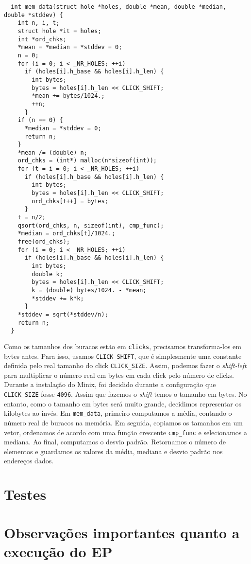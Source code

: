 \documentclass{amsart}
\theoremstyle{plain}
\newcommand{\code}[1]{\lstinline[mathescape=true]{#1}}
\begin{document}
\begin{verbatim}
  int mem_data(struct hole *holes, double *mean, double *median, double *stddev) {
    int n, i, t;
    struct hole *it = holes;
    int *ord_chks;
    *mean = *median = *stddev = 0;
    n = 0;
    for (i = 0; i < _NR_HOLES; ++i)
      if (holes[i].h_base && holes[i].h_len) {
        int bytes;
        bytes = holes[i].h_len << CLICK_SHIFT;
        *mean += bytes/1024.;
        ++n;
      }
    if (n == 0) {
      *median = *stddev = 0;
      return n;
    }
    *mean /= (double) n;
    ord_chks = (int*) malloc(n*sizeof(int));
    for (t = i = 0; i < _NR_HOLES; ++i)
      if (holes[i].h_base && holes[i].h_len) {
        int bytes;
        bytes = holes[i].h_len << CLICK_SHIFT;
        ord_chks[t++] = bytes;
      }
    t = n/2;
    qsort(ord_chks, n, sizeof(int), cmp_func);
    *median = ord_chks[t]/1024.;
    free(ord_chks);
    for (i = 0; i < _NR_HOLES; ++i)
      if (holes[i].h_base && holes[i].h_len) {
        int bytes;
        double k;
        bytes = holes[i].h_len << CLICK_SHIFT;
        k = (double) bytes/1024. - *mean;
        *stddev += k*k;
      }
    *stddev = sqrt(*stddev/n);
    return n;
  }
\end{verbatim}

Como os tamanhos dos buracos estão em \code{clicks}, precisamos transforma-los em bytes antes. Para
isso, usamos \code{CLICK_SHIFT}, que é simplesmente uma constante definida pelo real tamanho do
click \code{CLICK_SIZE}. Assim, podemos fazer o \textit{shift-left} para multiplicar o número real
em bytes em cada click pelo número de clicks. Durante a instalação do Minix, foi decidido durante a
configuração que \code{CLICK_SIZE} fosse \code{4096}. Assim que fazemos o \textit{shift} temos o
tamanho em bytes. No entanto, como o tamanho em bytes será muito grande, decidimos representar os
kilobytes ao invés. Em \code{mem_data}, primeiro computamos a média, contando o número real de
buracos na memória. Em seguida, copiamos os tamanhos em um vetor, ordenamos de acordo com uma
função crescente \code{cmp_func} e selecionamos a mediana. Ao final, computamos o desvio padrão.
Retornamos o número de elementos e guardamos os valores da média, mediana e desvio padrão nos
endereços dados.

\section{Testes}

\section{Observações importantes quanto a execução do EP}
\end{document}
